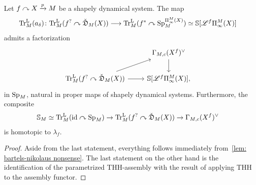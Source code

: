 \begin{prop}\label{prop: lax calculation of trace on coshv hat}
  Let $f\curvearrowright X\xrightarrow pM$ be a shapely dynamical system. 
  The map
  \[
    \TrcL (a_\delta)\colon \TrcL (f^?\curvearrowright\coShat_\base (\tset ))\too \TrcL(f^*\curvearrowright \Sp_\base^{\ani{\tset}[\base]})\simeq \SS [\cL^{f}\ani{\tset}[\base]]
  \]
  admits a factorization
  \begin{equation}
    \label{eq:lax-trace-on-cosheaves}
    \begin{tikzcd}
      &  \pbmsec{X^f}{\base}\\
      \TrcL (f^?\curvearrowright\coShat_\base (\tset )) & {\SS [\cL^{f}\ani{\tset}[\base]]},
      \arrow[from=1-2, to=2-2]
      \arrow[from=2-1, to=1-2]
      \arrow[from=2-1, to=2-2]
    \end{tikzcd}
  \end{equation}
  in $\operatorname{Sp}_M$, natural in proper maps of shapely dynamical systems. Furthermore, the composite
  \[
    \mathbb{S}_M\simeq\mathrm{Tr}^{\mathrm{L}}_{M} (\operatorname{id}\curvearrowright\operatorname{Sp}_M)\to \mathrm{Tr}^{\mathrm{L}}_{M} (f^?\curvearrowright\check{\mathfrak{D}}_M (X ))\to \Gamma_{M,c}(X^f)^{\vee}
  \]
  is homotopic to $\lambda_f$.
\end{prop}
\begin{proof}
  Aside from the last statement, everything follows immediately from~\cref{lem: bartels-nikolaus nonsense}. The last statement on the other hand is the identification of the parametrized THH-assembly with the result of applying THH to the assembly functor. 
\end{proof}

